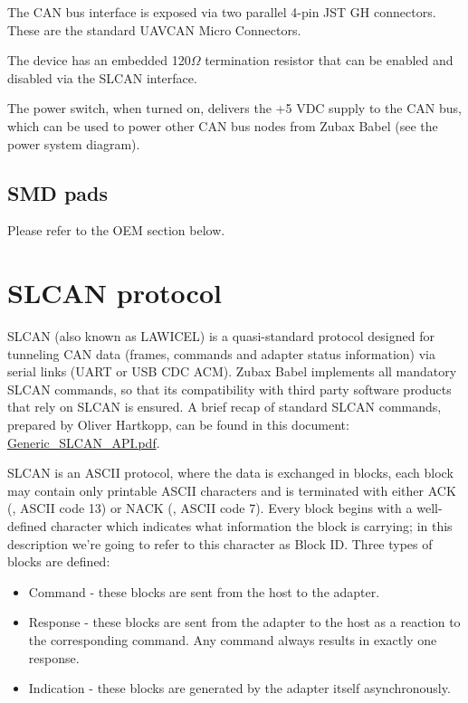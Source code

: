 \documentclass{zubaxdoc}
\begin{document}
The CAN bus interface is exposed via two parallel 4-pin JST GH connectors. These are the standard UAVCAN Micro Connectors.

The device has an embedded 120$\Omega$ termination resistor that can be enabled and disabled via the SLCAN interface.

The power switch, when turned on, delivers the +5 VDC supply to the CAN bus, which can be used to power other CAN bus nodes from Zubax Babel (see the power system diagram).

\section{SMD pads}

Please refer to the OEM section below.

\chapter{SLCAN protocol}

SLCAN (also known as LAWICEL) is a quasi-standard protocol designed for tunneling CAN data (frames, commands and adapter status information) via serial links (UART or USB CDC ACM). Zubax Babel implements all mandatory SLCAN commands, so that its compatibility with third party software products that rely on SLCAN is ensured. A brief recap of standard SLCAN commands, prepared by Oliver Hartkopp, can be found in this document: \href{https://docs.zubax.com/zubax_babel/Generic_SLCAN_API.pdf}{Generic\_SLCAN\_API.pdf}.

SLCAN is an ASCII protocol, where the data is exchanged in blocks, each block may contain only printable ASCII characters and is terminated with either ACK (, ASCII code 13) or NACK (, ASCII code 7). Every block begins with a well-defined character which indicates what information the block is carrying; in this description we’re going to refer to this character as Block ID. Three types of blocks are defined:

\begin{itemize}
\item Command - these blocks are sent from the host to the adapter.
\item Response - these blocks are sent from the adapter to the host as a reaction to the corresponding command. Any command always results in exactly one response.
\item Indication - these blocks are generated by the adapter itself asynchronously.
\end{itemize}
\end{document}
